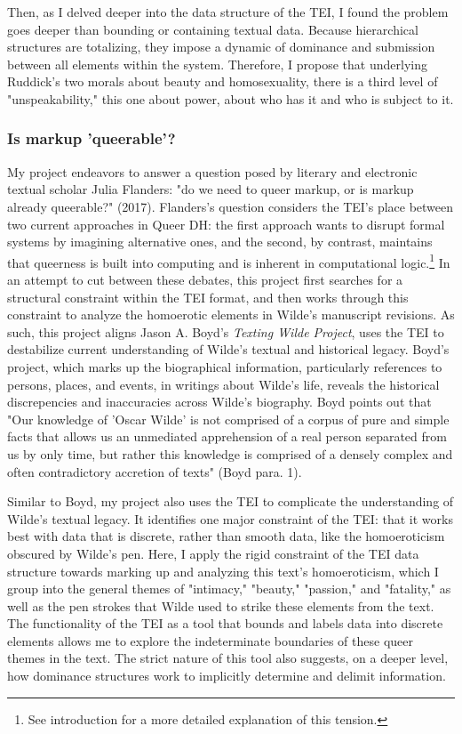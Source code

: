 \documentclass[11pt]{article}
\begin{document}
Then, as I delved deeper into the data structure of the TEI, I found
the problem goes deeper than bounding or containing textual
data. Because hierarchical structures are totalizing, they impose a
dynamic of dominance and submission between all elements within the
system. Therefore, I propose that underlying Ruddick's two morals
about beauty and homosexuality, there is a third level of
"unspeakability," this one about power, about who has it and who is
subject to it.

\subsubsection{Is markup 'queerable'?}
\label{sec:org3e2319d}
My project endeavors to answer a question posed by literary and
electronic textual scholar Julia Flanders: "do we need to queer
markup, or is markup already queerable?" (2017). Flanders's question
considers the TEI's place between two current approaches in Queer DH:
the first approach wants to disrupt formal systems by imagining
alternative ones, and the second, by contrast, maintains that
queerness is built into computing and is inherent in computational
logic.\footnote{See introduction for a more detailed explanation of this
tension.} In an attempt to cut between these debates, this project
first searches for a structural constraint within the TEI format, and
then works through this constraint to analyze the homoerotic elements
in Wilde's manuscript revisions. As such, this project aligns Jason
A. Boyd's \emph{Texting Wilde Project}, uses the TEI to destabilize current
understanding of Wilde's textual and historical legacy. Boyd's
project, which marks up the biographical information, particularly
references to persons, places, and events, in writings about Wilde's
life, reveals the historical discrepencies and inaccuracies across
Wilde's biography. Boyd points out that "Our knowledge of 'Oscar
Wilde' is not comprised of a corpus of pure and simple facts that
allows us an unmediated apprehension of a real person separated from
us by only time, but rather this knowledge is comprised of a densely
complex and often contradictory accretion of texts" (Boyd para. 1).

Similar to Boyd, my project also uses the TEI to complicate the
understanding of Wilde's textual legacy. It identifies one major
constraint of the TEI: that it works best with data that is discrete,
rather than smooth data, like the homoeroticism obscured by Wilde's
pen. Here, I apply the rigid constraint of the TEI data structure
towards marking up and analyzing this text's homoeroticism, which I
group into the general themes of "intimacy," "beauty," "passion," and
"fatality," as well as the pen strokes that Wilde used to strike these
elements from the text. The functionality of the TEI as a tool that
bounds and labels data into discrete elements allows me to explore the
indeterminate boundaries of these queer themes in the text. The strict
nature of this tool also suggests, on a deeper level, how dominance
structures work to implicitly determine and delimit information. 
\end{document}
